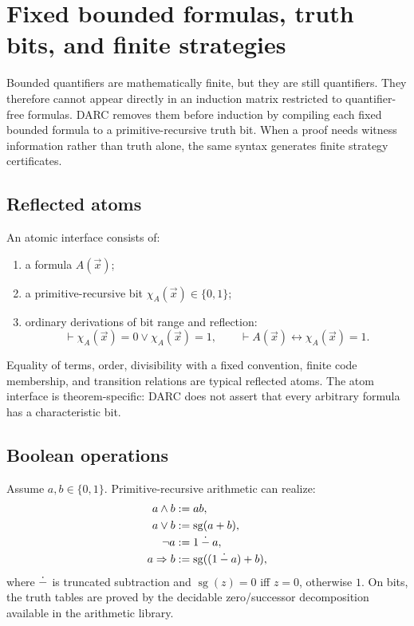 \section{Fixed bounded formulas, truth bits, and finite strategies}
\label{sec:bounded}

Bounded quantifiers are mathematically finite, but they are still quantifiers.
They therefore cannot appear directly in an induction matrix restricted to
quantifier-free formulas.  DARC removes them before induction by compiling each
fixed bounded formula to a primitive-recursive truth bit.  When a proof needs
witness information rather than truth alone, the same syntax generates finite
strategy certificates.

\subsection{Reflected atoms}

An atomic interface consists of:
\begin{enumerate}
  \item a formula \(A(\vec x)\);
  \item a primitive-recursive bit \(\chi_A(\vec x)\in\{0,1\}\);
  \item ordinary derivations of bit range and reflection:
\[
  \vdash \chi_A(\vec x)=0\vee\chi_A(\vec x)=1,
  \qquad
  \vdash A(\vec x)\leftrightarrow \chi_A(\vec x)=1.
\]
\end{enumerate}
Equality of terms, order, divisibility with a fixed convention, finite code
membership, and transition relations are typical reflected atoms.  The atom
interface is theorem-specific: DARC does not assert that every arbitrary
formula has a characteristic bit.

\subsection{Boolean operations}

Assume \(a,b\in\{0,1\}\).  Primitive-recursive arithmetic can realize:
\begin{align*}
  a\wedge b &: =ab,\\
  a\vee b &: =\operatorname{sg}(a+b),\\
  \neg a &: =1\mathbin{\dot{-}} a,\\
  a\Rightarrow b &: =\operatorname{sg}((1\mathbin{\dot{-}} a)+b),
\end{align*}
where \(\mathbin{\dot{-}}\) is truncated subtraction and
\(\operatorname{sg}(z)=0\) iff \(z=0\), otherwise \(1\).  On bits, the truth
tables are proved by the decidable zero/successor decomposition available in
the arithmetic library.

